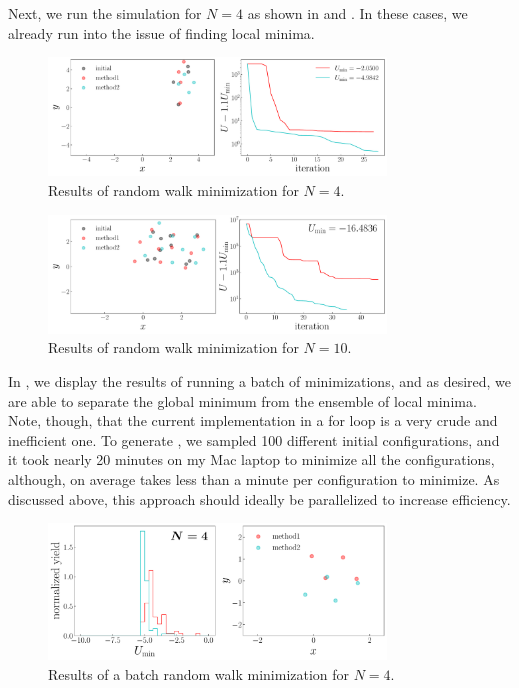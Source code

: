 Next, we run the simulation for $N = 4$ as shown in  and .
In these cases, we already run into the issue of finding local minima.

\begin{figure}[h!tb]
    \centering
    \includegraphics[width=0.8\textwidth]{track_min4.pdf}
    \caption{Results of random walk minimization for $N =4$.}
    \label{fig:track-min4}
\end{figure}

\begin{figure}[h!tb]
    \centering
    \includegraphics[width=0.8\textwidth]{track_min10.pdf}
    \caption{Results of random walk minimization for $N = 10$.}
    \label{fig:track-min10}
\end{figure}

In , we display the results of running a batch of minimizations, and as desired, we are able to separate the global minimum from the ensemble of local minima.
Note, though, that the current implementation in a for loop is a very crude and inefficient one.
To generate , we sampled 100 different initial configurations, and it took nearly 20 minutes on my Mac laptop to minimize all the configurations, although, on average takes less than a minute per configuration to minimize.
As discussed above, this approach should ideally be parallelized to increase efficiency.

\begin{figure}[h!tb]
    \centering
    \includegraphics[width=0.8\textwidth]{batch_min4.pdf}
    \caption{Results of a batch random walk minimization for $N = 4$.}
    \label{fig:batch-min4}
\end{figure}


